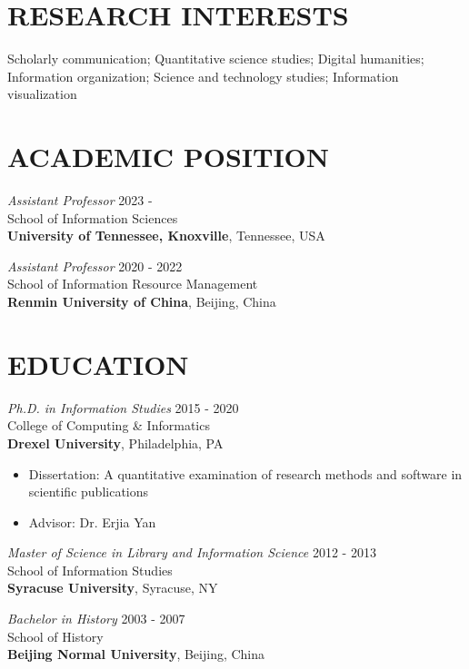 \documentclass[margin, 10pt]{res} %
\begin{document}
\begin{resume}


\section{RESEARCH INTERESTS}  

Scholarly communication; Quantitative science studies; Digital humanities; Information organization; Science and technology studies; Information visualization

\section{ACADEMIC POSITION}

{\sl Assistant Professor} \hfill 2023 -  \\
School of Information Sciences\\
\textbf{University of Tennessee, Knoxville}, Tennessee, USA

{\sl Assistant Professor} \hfill 2020 - 2022 \\
School of Information Resource Management\\
\textbf{Renmin University of China}, Beijing, China

\section{EDUCATION}

{\sl Ph.D. in Information Studies} \hfill 2015 - 2020 \\
College of Computing \& Informatics\\
\textbf{Drexel University}, Philadelphia, PA
\begin{itemize}
\item Dissertation: A quantitative examination of research methods and software in scientific publications
\item Advisor: Dr. Erjia Yan
\end{itemize} 

{\sl Master of Science in Library and Information Science} \hfill 2012 - 2013 \\
School of Information Studies\\
\textbf{Syracuse University}, Syracuse, NY
 
{\sl Bachelor in History} \hfill 2003 - 2007\\
School of History\\
\textbf{Beijing Normal University}, Beijing, China


\end{resume}
\end{document}
